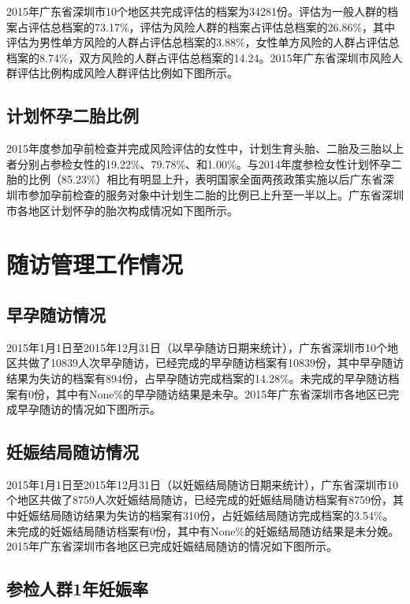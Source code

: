 2015年广东省深圳市10个地区共完成评估的档案为34281份。评估为一般人群的档案占评估总档案的73.17\%，评估为风险人群的档案占评估总档案的26.86\%，其中评估为男性单方风险的人群占评估总档案的3.88\%，女性单方风险的人群占评估总档案的8.74\%，双方风险的人群占评估总档案的14.24。2015年广东省深圳市风险人群评估比例构成风险人群评估比例如下图所示。



\subsection{计划怀孕二胎比例}

2015年度参加孕前检查并完成风险评估的女性中，计划生育头胎、二胎及三胎以上者分别占参检女性的19.22\%、79.78\%、和1.00\%。与2014年度参检女性计划怀孕二胎的比例（85.23\%）相比有明显上升，表明国家全面两孩政策实施以后广东省深圳市参加孕前检查的服务对象中计划生二胎的比例已上升至一半以上。广东省深圳市各地区计划怀孕的胎次构成情况如下图所示。



\section{随访管理工作情况}

\subsection{早孕随访情况}

2015年1月1日至2015年12月31日（以早孕随访日期来统计），广东省深圳市10个地区共做了10839人次早孕随访，已经完成的早孕随访档案有10839份，其中早孕随访结果为失访的档案有894份，占早孕随访完成档案的14.28\%。未完成的早孕随访档案有0份，其中有None\%的早孕随访结果是未孕。2015年广东省深圳市各地区已完成早孕随访的情况如下图所示。



\subsection{妊娠结局随访情况}

2015年1月1日至2015年12月31日（以妊娠结局随访日期来统计），广东省深圳市10个地区共做了8759人次妊娠结局随访，已经完成的妊娠结局随访档案有8759份，其中妊娠结局随访结果为失访的档案有310份，占妊娠结局随访完成档案的3.54\%。未完成的妊娠结局随访档案有0份，其中有None\%的妊娠结局随访结果是未分娩。2015年广东省深圳市各地区已完成妊娠结局随访的情况如下图所示。



\subsection{参检人群1年妊娠率}

